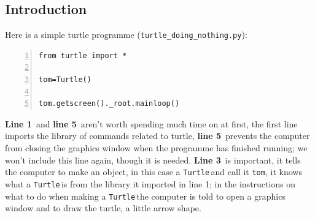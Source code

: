 \documentclass[11pt,a4paper]{scrartcl}
\newcommand{\turtle}{\texttt{Turtle}\,}
\newcommand{\lnn}[1]{\textbf{line #1}\,}
\newcommand{\Lnn}[1]{\textbf{Line #1}\,}
\begin{document}
\subsection*{Introduction}
Here is a simple turtle programme (\texttt{turtle\_doing\_nothing.py}):
\begin{lstlisting}[numbers=left]
from turtle import *

tom=Turtle()

tom.getscreen()._root.mainloop()
\end{lstlisting}
\Lnn{1} and \lnn{5} aren't worth spending much time on at first, the first
line imports the library of commands related to turtle, \lnn{5}
prevents the computer from closing the graphics window when the
programme has finished running; we won't include this line again,
though it is needed. \Lnn{3} is important, it tells the computer to
make an object, in this case a \turtle and call it \texttt{tom}, it
knows what a \turtle is from the library it imported in line 1; in the
instructions on what to do when making a \turtle the computer is told
to open a graphics window and to draw the turtle, a little arrow
shape.
\begin{center}
\end{center}
\end{document}
